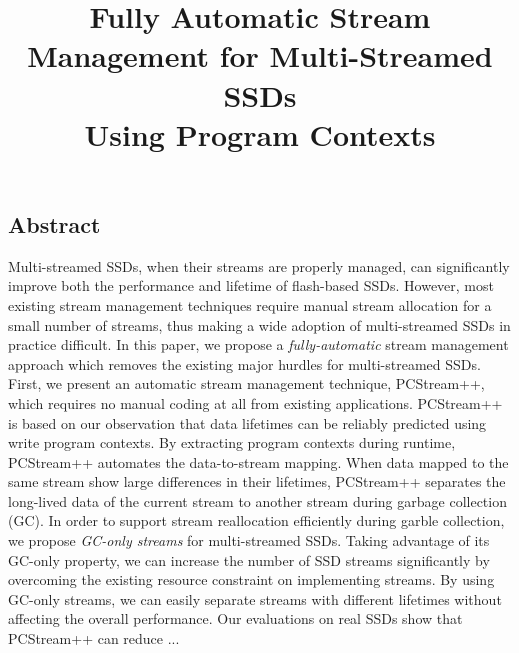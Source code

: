 \documentclass[letterpaper, twocolumn, 10pt]{article}
\begin{document}
\title{
\bf Fully Automatic Stream Management for Multi-Streamed SSDs \\ Using Program Contexts}

%


\maketitle
\pagestyle{empty}
\subsection*{Abstract}
Multi-streamed SSDs, when their streams are properly managed, 
can significantly improve both the performance and lifetime of flash-based SSDs.  
However, most existing stream management techniques
require manual stream allocation for a small number of streams, thus making 
a wide adoption of multi-streamed SSDs in practice difficult.  
In this paper, we propose a {\it fully-automatic} stream
management approach which removes the existing major hurdles for multi-streamed SSDs.  
First, we present  an automatic stream management technique, PCStream++, which requires 
no manual coding at all from existing applications.   
PCStream++ is based on our observation that data lifetimes can be reliably predicted
using write program contexts.
By extracting program contexts during runtime, PCStream++ automates the data-to-stream mapping.  
When data mapped to the same stream show large differences in their lifetimes,
PCStream++ separates the long-lived data of the current stream to 
another stream during garbage collection (GC).   
In order to support stream reallocation efficiently during garble collection, 
we propose {\it GC-only streams} for multi-streamed SSDs.   
Taking advantage of its GC-only property, we can increase the number of SSD streams 
significantly by overcoming the existing resource constraint on implementing streams.  
By using GC-only streams, we can easily separate streams with
different lifetimes without affecting the overall performance.    
Our evaluations on real SSDs show that PCStream++ can reduce ...








\end{document}
